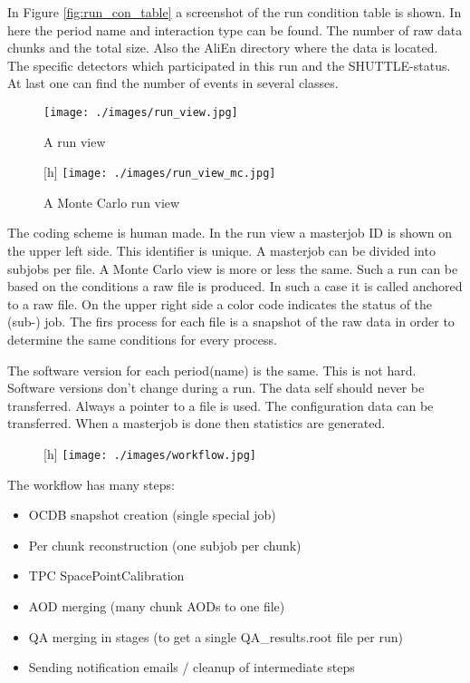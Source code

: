 In Figure \ref{fig:run_con_table} a screenshot of the run condition table is shown. In here the period name and interaction type can be found. The number of raw data chunks and the total size. Also the AliEn directory where the data is located. The specific detectors which participated in this run and the SHUTTLE-status. At last one can find the number of events in several classes.

\begin{figure}[h]
  \begin{center}
    \texttt{[image: ./images/run\_view.jpg]}
    \caption{A run view}
    \label{fig:run_view}
  \end{center}
\end{figure}


\begin{figure}
  \begin{center}[h]
    \texttt{[image: ./images/run\_view\_mc.jpg]}
    \caption{A Monte Carlo run view}
    \label{fig:run_view_mc}
  \end{center}
\end{figure}

The coding scheme is human made. In the run view a masterjob ID is shown on the upper left side. This identifier is unique. A masterjob can be divided into subjobs per file. A Monte Carlo view is more or less the same. Such a run can be based on the conditions a raw file is produced. In such a case it is called anchored to a raw file. On the upper right side a color code indicates the status of the (sub-) job. The firs process for each file is a snapshot of the raw data in order to determine the same conditions for every process.

The software version for each period(name) is the same. This is not hard. Software versions don't change during a run. The data self should never be transferred. Always a pointer to a file is used. The configuration data can be transferred. When a masterjob is done then statistics are generated. 

\begin{figure}
  \begin{center}[h]
    \texttt{[image: ./images/workflow.jpg]}
    \caption{}
    \label{fig:}
  \end{center}
\end{figure}

The workflow has many steps:
\begin{itemize}
  \item OCDB snapshot creation (single special job)
  \item Per chunk reconstruction (one subjob per chunk)
  \item TPC SpacePointCalibration
  \item AOD merging (many chunk AODs to one file)
  \item QA merging in stages (to get a single QA\_results.root file per run)
  \item Sending notification emails / cleanup of intermediate steps
\end{itemize}

